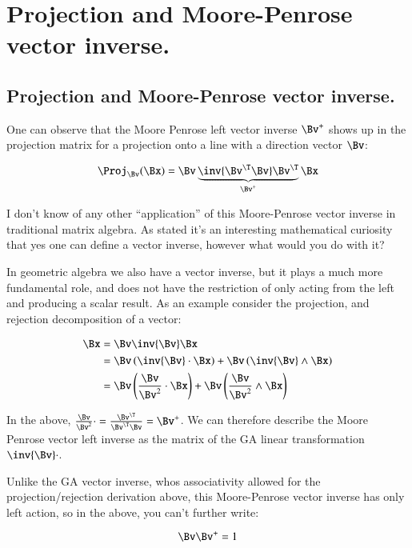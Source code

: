 \chapter{Projection and Moore-Penrose vector inverse.}
\date{ May 16, 2008.  Last Revision: $Date: 2009/06/04 13:13:27 $ }

\section{Projection and Moore-Penrose vector inverse. }

One can observe that the Moore Penrose left vector inverse $\Bv^+$ shows up in the projection matrix for a projection onto a line with a direction vector $\Bv$:

\begin{equation}
\Proj_\Bv(\Bx) = \Bv \underbrace{\inv{ \Bv^\T \Bv} \Bv^\T}_{\Bv^+} \Bx
\end{equation}

I don't know of any other ``application'' of this Moore-Penrose vector inverse in traditional matrix algebra.  As stated it's an interesting mathematical curiosity that yes one can define a vector inverse, however what would you do with it?

In geometric algebra we also have a vector inverse, but it plays a much more fundamental role, and does not have the restriction of only acting from the left and 
producing a scalar result.  As an example consider the projection, and rejection decomposition of a vector:

\begin{align*}
\Bx 
&= \Bv \inv{\Bv} \Bx \\
&= \Bv \left(\inv{\Bv} \cdot \Bx\right) + \Bv \left(\inv{\Bv} \wedge \Bx\right) \\
&= \Bv 
\left(
\frac{\Bv}{\Bv^2} \cdot 
 \Bx\right)
 + \Bv \left(\frac{\Bv}{\Bv^2} \wedge \Bx\right) \\
\end{align*}

In the above, $\frac{\Bv}{\Bv^2} \cdot = \frac{\Bv^\T}{\Bv^\T \Bv} = \Bv^+$.  We can therefore describe the Moore Penrose vector left inverse as the matrix of the GA linear transformation $\inv{\Bv} \cdot$.

Unlike the GA vector inverse, whos associativity allowed for the projection/rejection derivation above, this Moore-Penrose vector inverse has only left action, so in the above, you can't further write:

\[
\Bv \Bv^{+} = 1
\]

